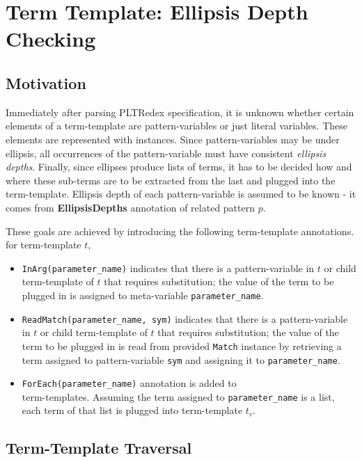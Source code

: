 \section{Term Template: Ellipsis Depth Checking}

\subsection{Motivation}

Immediately after parsing PLTRedex specification, it is unknown whether certain elements of a term-template are pattern-variables or just literal variables. These elements are represented with \UnresolvedSymbol instances. Since pattern-variables may be under ellipsis, all occurrences of the pattern-variable must have consistent \textit{ellipsis depths}. Finally, since ellipses produce lists of terms, it has to be decided how and where these sub-terms are to be extracted from the last and plugged into the term-template. Ellipsis depth of each pattern-variable is assumed to be known - it comes from \textbf{EllipsisDepths} annotation of related pattern $p$.

These goals are achieved by introducing the following term-template annotations. for term-template $t$,

\begin{itemize}
\item
\texttt{InArg(parameter\_name)} indicates that there is a pattern-variable in $t$ or child term-template of $t$ that requires substitution; the value of the term to be plugged in is assigned to meta-variable \texttt{parameter\_name}.
\item
\texttt{ReadMatch(parameter\_name, sym)} indicates that there is a pattern-variable in $t$ or child term-template of $t$ that requires substitution; the value of the term to be plugged in is read from provided \texttt{Match} instance by retrieving a term assigned to pattern-variable \texttt{sym} and assigning it to \texttt{parameter\_name}.
\item
\texttt{ForEach(parameter\_name)} annotation is added to \TermRepeat \\ term-templates. Assuming the term assigned to \texttt{parameter\_name} is a list, each term of that list is plugged into term-template $t_r$.
\end{itemize}

\subsection{Term-Template Traversal}

